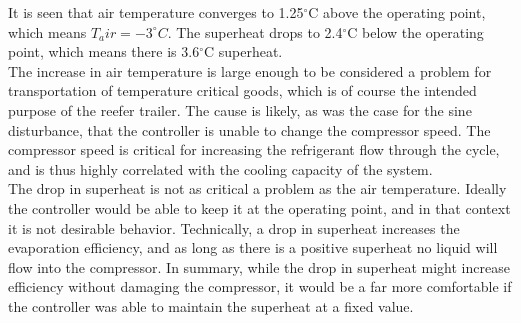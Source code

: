 It is seen that air temperature converges to 1.25$^{\circ}$C above the operating point, which means $T_air = -3^{\circ}C$. The superheat drops to 2.4$^{\circ}$C below the operating point, which means there is 3.6$^{\circ}$C superheat.\\

The increase in air temperature is large enough to be considered a problem for transportation of temperature critical goods, which is of course the intended purpose of the reefer trailer. The cause is likely, as was the case for the sine disturbance, that the controller is unable to change the compressor speed. The compressor speed is critical for increasing the refrigerant flow through the cycle, and is thus highly correlated with the cooling capacity of the system. \\

The drop in superheat is not as critical a problem as the air temperature. Ideally the controller would be able to keep it at the operating point, and in that context it is not desirable behavior. Technically, a drop in superheat increases the evaporation efficiency, and as long as there is a positive superheat no liquid will flow into the compressor. In summary, while the drop in superheat might increase efficiency without damaging the compressor, it would be a far more comfortable if the controller was able to maintain the superheat at a fixed value.

